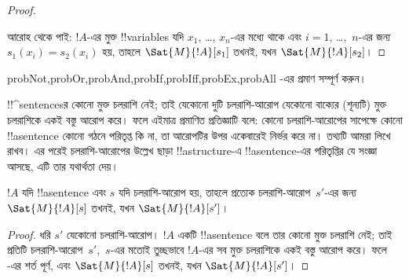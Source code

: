 \documentclass[../../../include/open-logic-section]{subfiles}
\begin{document}
\begin{proof}
\begin{enumerate}
\end{enumerate}

আরোহ থেকে পাই: $!A$-এর মুক্ত !!{variable}s যদি $x_1$, \dots, $x_n$-এর
মধ্যে থাকে এবং $i = 1$, \dots,~$n$-এর জন্য $s_1(x_i)=s_2(x_i)$ হয়,
তাহলে $\Sat{M}{!A}[s_1]$ তখনই, যখন $\Sat{M}{!A}[s_2]$।
\end{proof}

\begin{probtag}{probNot,probOr,probAnd,probIf,probIff,probEx,probAll}
-এর প্রমাণ সম্পূর্ণ করুন।
\end{probtag}

\begin{explain}
!!^{sentence}sর কোনো মুক্ত চলরাশি নেই; তাই যেকোনো দুটি চলরাশি-আরোপ
যেকোনো বাক্যের (শূন্যটি) মুক্ত চলরাশিকে একই বস্তু আরোপ করে। ফলে এইমাত্র
প্রমাণিত প্রতিজ্ঞাটি বলে: কোনো চলরাশি-আরোপের সাপেক্ষে কোনো
!!a{sentence} কোনো গঠনে পরিতৃপ্ত কি না, তা আরোপটির উপর একেবারেই নির্ভর
করে না। তথ্যটি আমরা লিখে রাখব। এর পরেই চলরাশি-আরোপের উল্লেখ ছাড়া
!!a{structure}-এ !!a{sentence}-এর পরিতৃপ্তির যে সংজ্ঞা আসছে, এটি তার
যথার্থতা দেয়।
\end{explain}

\begin{cor}
$!A$ যদি !!a{sentence} এবং $s$ যদি চলরাশি-আরোপ হয়, তাহলে প্রত্যেক
চলরাশি-আরোপ~$s'$-এর জন্য $\Sat{M}{!A}[s]$ তখনই, যখন
$\Sat{M}{!A}[s']$।
\end{cor}

\begin{proof}
  ধরি $s'$ যেকোনো চলরাশি-আরোপ। $!A$ একটি !!a{sentence} বলে তার কোনো
  মুক্ত চলরাশি নেই; তাই প্রতিটি চলরাশি-আরোপ~$s'$,~$s$-এর মতোই তুচ্ছভাবে
  $!A$-এর সব মুক্ত চলরাশিকে একই বস্তু আরোপ করে। ফলে
  -এর শর্ত পূর্ণ, এবং $\Sat{M}{!A}[s]$ তখনই,
  যখন $\Sat{M}{!A}[s']$।
\end{proof}
\end{document}
